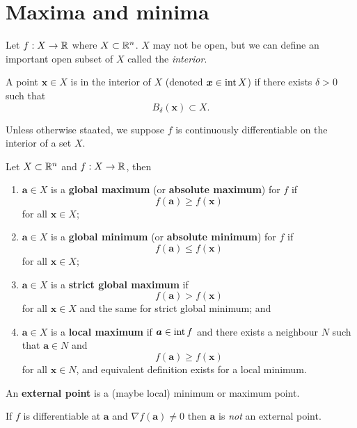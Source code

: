 \section{Maxima and minima}

Let $f: X \to \mathbb{R}$ where $X \subset \mathbb{R}^n$. $X$ may not be open, but we can define an important open subset of $X$ called the \emph{interior}.

\begin{definition}[Interior]
    A point $\bm x \in X$ is in the interior of $X$ (denoted $\bm x \in \operatorname{int}{X}$) if there exists $\delta > 0$ such that 
    \[ B_\delta(\bm x) \subset X. \]
\end{definition}

Unless otherwise staated, we suppose $f$ is continuously differentiable on the interior of a set $X$.

\begin{definition}
    Let $X \subset \mathbb{R}^n$ and $f: X \to \mathbb{R}$, then
    \begin{enumerate}
        \item $\bm a \in X$ is a \textbf{global maximum} (or \textbf{absolute maximum}) for $f$ if
            \[ f(\bm a) \geq f(\bm x) \]
            for all $\bm x \in X$;
        \item $\bm a \in X$ is a \textbf{global minimum} (or \textbf{absolute minimum}) for $f$ if
            \[ f(\bm a) \leq f(\bm x) \]
            for all $\bm x \in X$;
        \item $\bm a \in X$ is a \textbf{strict global maximum} if
            \[ f(\bm a) > f(\bm x) \]
            for all $\bm x \in X$ and the same for strict global minimum; and
        \item $\bm a \in X$ is a \textbf{local maximum} if $\bm a \in \operatorname{int}{f}$ and there exists a neighbour $N$ such that $\bm a \in N$ and 
            \[ f(\bm a) \geq f(\bm x) \]
            for all $\bm x \in N$, and equivalent definition exists for a local minimum.
    \end{enumerate}
\end{definition}


\begin{definition}[External]
    An \textbf{external point} is a (maybe local) minimum or maximum point.
\end{definition}

\begin{proposition}[]
    If $f$ is differentiable at $\bm a$ and $\nabla f(\bm a) \neq 0$ then $\bm a$ is \emph{not} an external point.
\end{proposition}


